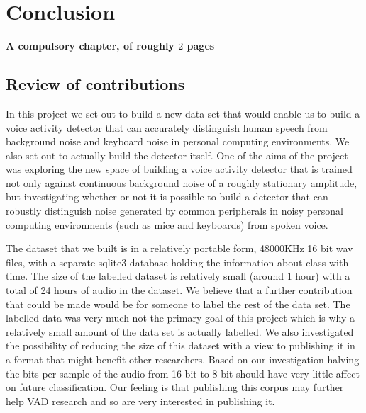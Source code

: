 \documentclass[ %
                    author={Sam Phippen},
                supervisor={Dr. Rafal Bogacz},
                     title={Real time voice activity detectors in noisy personal computing environments},
                  subtitle={},
                    degree={MEng},
                      year={2012} ]{thesis}
\begin{document}

\chapter{Conclusion}
\label{chap:conclusion}

{\bf A compulsory chapter, of roughly $2$ pages} 

\section{Review of contributions}

In this project we set out to build a new data set that would enable us to
build a voice activity detector that can accurately distinguish human speech
from background noise and keyboard noise in personal computing environments. We
also set out to actually build the detector itself. One of the aims of the
project was exploring the new space of building a voice activity detector that
is trained not only against continuous background noise of a roughly stationary
amplitude, but investigating whether or not it is possible to build a detector
that can robustly distinguish noise generated by common peripherals in noisy
personal computing environments (such as mice and keyboards) from spoken voice.

The dataset that we built is in a relatively portable form, 48000KHz 16 bit wav
files, with a separate sqlite3 database holding the information about class
with time. The size of the labelled dataset is relatively small (around 1 hour)
with a total of 24 hours of audio in the dataset. We believe that a further
contribution that could be made would be for someone to label the rest of the
data set. The labelled data was very much not the primary goal of this project
which is why a relatively small amount of the data set is actually labelled. We
also investigated the possibility of reducing the size of this dataset with a
view to publishing it in a format that might benefit other researchers. Based
on our investigation halving the bits per sample of the audio from 16 bit to
8 bit should have very little affect on future classification. Our feeling is
that publishing this corpus may further help VAD research and so are very
interested in publishing it.
\end{document}
